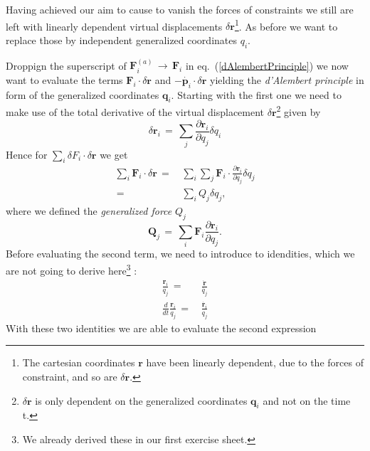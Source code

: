 \documentclass{report}
\renewcommand{\vec}[1]{\mathbf{#1}}
\begin{document}
Having achieved our aim to cause to vanish the forces of constraints we still
are left with linearly dependent virtual displacements $\delta \vec
r$\footnote{The cartesian coordinates $\vec r$ have been linearly dependent,
due to the forces of constraint, and so are $\delta \vec r$.}. As before we
want to replace those by independent generalized coordinates $q_i$.

Droppign the superscript of $\vec F_i^{(a)} \,\to\, \vec F_i$ in
eq.~(\ref{dAlembertPrinciple}) we now want to evaluate the terms $\vec F_i
\cdot \delta \vec r$ and $- \dot{\vec p_i} \cdot \delta \vec r$ yielding the
\textit{d'Alembert principle} in form of the generalized coordinates $\vec
q_i$. Starting with the first one we need to make use of the total derivative
of the virtual displacement $\delta \vec r$\footnote{$\delta \vec r$ is only
dependent on the generalized coordinates $\vec q_i$ and not on the time t.}
given by
\begin{equation}
  \delta \vec r_i \,=\, \sum_j \frac{\partial \vec r_i}{\partial q_j} \delta
q_i 
\end{equation}
Hence for $\sum_i \delta F_i \cdot \delta \vec r$ we get
\begin{equation}
  \label{dAlembertFirst}
  \begin{aligned}
    \sum_i \vec F_i \cdot \delta \vec r \,=\,& \sum_i \sum_j \vec F_i \cdot
\frac{\partial \vec r_i}{\partial q_j} \delta q_j \\
    \,=\,& \sum_i Q_j \delta q_j,
  \end{aligned}
\end{equation}
where we defined the \textit{generalized force} $Q_j$ 
\begin{equation}
  \label{generalizedForce}
  \vec Q_j \,=\, \sum_i \vec F_i \frac{\partial \vec r_i}{\partial q_j}.
\end{equation}
Before evaluating the second term, we need to introduce to
idendities, which we are not going to derive here\footnote{We already derived these in our first exercise sheet.} :
\begin{align}
  \frac{\vec r_i}{q_j} \,=\,& \frac{\dot{\vec r}}{\dot{q_j}} \\
  \frac{d}{dt} \frac{\vec r_i}{q_j} \,=\,& \frac{\dot{\vec r_i}}{q_j}
\end{align}
With these two identities we are able to evaluate the second expression
\end{document}
